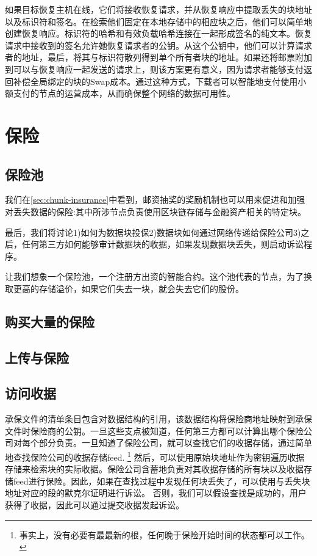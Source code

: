 如果目标恢复主机在线，它们将接收恢复请求，并从恢复响应中提取丢失的块地址以及标识符和签名。在检索他们固定在本地存储中的相应块之后，他们可以简单地创建恢复响应。标识符的哈希和有效负载哈希连接在一起形成签名的纯文本。恢复请求中接收到的签名允许她恢复请求者的公钥。从这个公钥中，他们可以计算请求者的地址，最后，将其与标识符散列得到单个所有者块的地址。如果还将邮票附加到可以与恢复响应一起发送的请求上，则该方案更有意义，因为请求者能够支付返回补偿全局绑定的块的Swap成本。通过这种方式，下载者可以智能地支付使用小额支付的节点的运营成本，从而确保整个网络的数据可用性。



\section{保险\statusorange}\label{sec:insurance}
 

\subsection{保险池\statusorange}
我们在\ref{sec:chunk-insurance}中看到，邮资抽奖的奖励机制也可以用来促进和加强对丢失数据的保险:其中所涉节点负责使用区块链存储与金融资产相关的特定块。

最后，我们将讨论1)如何为数据块投保2)数据块如何通过网络传递给保险公司3)之后，任何第三方如何能够审计数据块的收据，如果发现数据块丢失，则启动诉讼程序。

让我们想象一个保险池，一个注册方出资的智能合约。这个池代表的节点，为了换取更高的存储溢价，如果它们失去一块，就会失去它们的股份。 

\subsection{购买大量的保险}

\subsection{上传与保险\statusred}


\subsection{访问收据\statusred}

承保文件的清单条目包含对数据结构的引用，该数据结构将保险商地址映射到承保文件时保险商的公钥。一旦这些支点被知道，任何第三方都可以计算出哪个保险公司对每个部分负责。一旦知道了保险公司，就可以查找它们的收据存储，通过简单地查找保险公司的收据存储feed.%
%
\footnote{事实上，没有必要有最最新的根，任何晚于保险开始时间的状态都可以工作。}
%
然后，可以使用原始块地址作为密钥遍历收据存储来检索块的实际收据。保险公司含蓄地负责对其收据存储的所有块以及收据存储feed进行保险。因此，如果在查找过程中发现任何块丢失了，可以使用与丢失块地址对应的段的默克尔证明进行诉讼。 
否则，我们可以假设查找是成功的，用户获得了收据，因此可以通过提交收据发起诉讼。 


